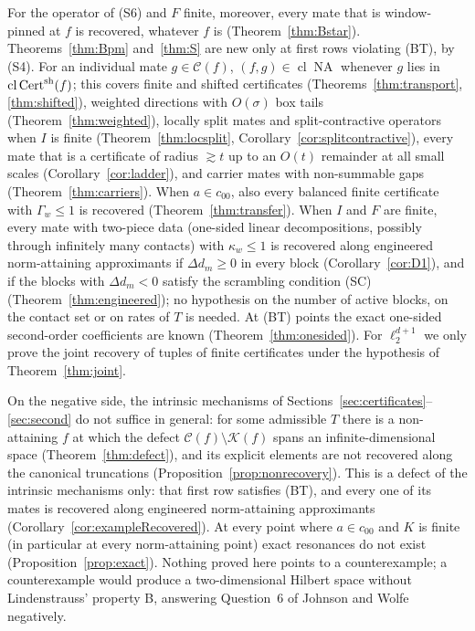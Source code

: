 \documentclass[10pt]{amsart}
\theoremstyle{definition}
\theoremstyle{remark}
\newcommand{\NA}{\operatorname{NA}}
\newcommand{\Cset}{\mathcal C}
\newcommand{\Cert}{\operatorname{Cert}}
\newcommand{\cl}{\operatorname{cl}}
\begin{document}
For the operator of (S6) and $F$ finite, moreover, every mate that is
window-pinned at $f$ is recovered, whatever $f$ is
(Theorem~\ref{thm:Bstar}).  Theorems~\ref{thm:Bpm} and~\ref{thm:S} are new
only at first rows violating \textup{(BT)}, by (S4).
For an individual mate $g\in\Cset(f)$, $(f,g)\in\cl\NA$ whenever $g$ lies
in $\cl\Cert^{\rm sh}(f)$; this covers finite and shifted certificates
(Theorems~\ref{thm:transport}, \ref{thm:shifted}), weighted directions with
$O(\sigma)$ box tails (Theorem~\ref{thm:weighted}), locally split mates and
split-contractive operators when $I$ is finite (Theorem~\ref{thm:locsplit},
Corollary~\ref{cor:splitcontractive}), every mate that is a certificate of
radius $\gtrsim t$ up to an $O(t)$ remainder at all small scales
(Corollary~\ref{cor:ladder}), and carrier mates with non-summable gaps
(Theorem~\ref{thm:carriers}).  When $a\in c_{00}$, also every balanced
finite certificate with $\Gamma_w\le1$ is recovered
(Theorem~\ref{thm:transfer}).  When $I$ and $F$ are finite, every mate with
two-piece data (one-sided linear decompositions, possibly through infinitely
many contacts) with $\kappa_w\le1$ is recovered along engineered
norm-attaining approximants if $\Delta d_m\ge0$ in every block
(Corollary~\ref{cor:D1}), and if the blocks with $\Delta d_m<0$ satisfy the
scrambling condition \textup{(SC)} (Theorem~\ref{thm:engineered}); no
hypothesis on the number of active blocks, on the contact set or on rates of
$T$ is needed.  At \textup{(BT)} points the exact one-sided second-order
coefficients are known (Theorem~\ref{thm:onesided}).  For $\ell_2^{d+1}$ we
only prove the joint recovery of tuples of finite certificates under the
hypothesis of Theorem~\ref{thm:joint}.

On the negative side, the intrinsic mechanisms of
Sections~\ref{sec:certificates}--\ref{sec:second} do not suffice in general:
for some admissible $T$ there is a non-attaining $f$ at which the defect
$\Cset(f)\setminus\mathcal K(f)$ spans an infinite-dimensional space
(Theorem~\ref{thm:defect}), and its explicit elements are not recovered
along the canonical truncations (Proposition~\ref{prop:nonrecovery}).  This
is a defect of the intrinsic mechanisms only: that first row satisfies
\textup{(BT)}, and every one of its mates is recovered along engineered
norm-attaining approximants (Corollary~\ref{cor:exampleRecovered}).  At
every point where $a\in c_{00}$ and $K$ is finite (in particular at every
norm-attaining point) exact resonances do not exist
(Proposition~\ref{prop:exact}).  Nothing proved here points to a
counterexample; a counterexample would produce a two-dimensional Hilbert
space without Lindenstrauss' property B, answering Question~6 of Johnson and
Wolfe \cite{JW} negatively.
\end{document}

